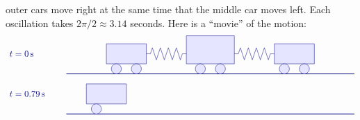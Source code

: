 \begin{solution}
\begin{itemize}
    outer cars move right at the same time that the middle car moves
    left. Each oscillation takes
    $2\pi/2\approx 3.14$ seconds. Here is a ``movie'' of the motion:
    \begin{equation*}
      \begin{tikzpicture}[scale=0.8, color=blue!50!black]
        \begin{scope}[yshift=0cm]
          \draw (-3,1) node[right] {$t=0\s$};
          \draw[thick] (0,0) -- (14.4,0);
          \begin{scope}[xshift=0cm]
            \draw[fill=blue!10] (2,0.5) rectangle (4,1.5);
            \draw[fill=blue!10] (2.5,0.25) circle (0.25);
            \draw[fill=blue!10] (3.5,0.25) circle (0.25);
          \end{scope}
          \begin{scope}[xshift=4.2cm]
            \draw[fill=blue!10] (1.8,0.5) rectangle (4.2,1.9);
            \draw[fill=blue!10] (2.5,0.25) circle (0.25);
            \draw[fill=blue!10] (3.5,0.25) circle (0.25);
          \end{scope}
          \begin{scope}[xshift=8.4cm]
            \draw[fill=blue!10] (2,0.5) rectangle (4,1.5);
            \draw[fill=blue!10] (2.5,0.25) circle (0.25);
            \draw[fill=blue!10] (3.5,0.25) circle (0.25);
          \end{scope}
          \begin{scope}[xshift=4cm]
            \draw (0,1) -- ++(0.2,0) -- ++(0.1,0.3)
            -- ++(0.2,-0.6) -- ++(0.2,0.6)
            -- ++(0.2,-0.6) -- ++(0.2,0.6)
            -- ++(0.2,-0.6) -- ++(0.2,0.6)
            -- ++(0.2,-0.6) -- ++(0.1,0.3)
            -- ++(0.2,0);
          \end{scope}
          \begin{scope}[xshift=8.4cm]
            \draw (0,1) -- ++(0.2,0) -- ++(0.1,0.3)
            -- ++(0.2,-0.6) -- ++(0.2,0.6)
            -- ++(0.2,-0.6) -- ++(0.2,0.6)
            -- ++(0.2,-0.6) -- ++(0.2,0.6)
            -- ++(0.2,-0.6) -- ++(0.1,0.3)
            -- ++(0.2,0);
          \end{scope}
        \end{scope}
        \begin{scope}[yshift=-2cm]
          \draw (-3,1) node[right] {$t=0.79\s$};
          \draw[thick] (0,0) -- (14.4,0);
          \begin{scope}[xshift=-1cm]
            \draw[fill=blue!10] (2,0.5) rectangle (4,1.5);
            \draw[fill=blue!10] (2.5,0.25) circle (0.25);

\end{scope}
\end{scope}
\end{tikzpicture}
\end{equation*}
\end{itemize}
\end{solution}

